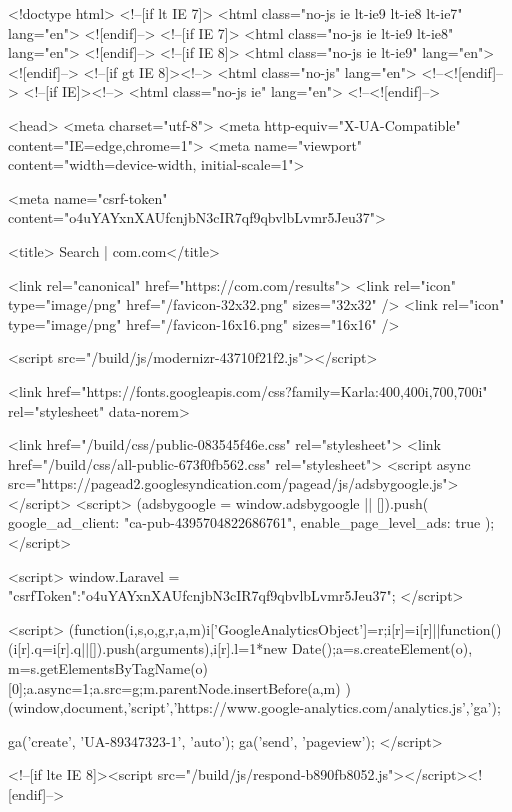 <!doctype html>
<!--[if lt IE 7]>      <html class="no-js ie lt-ie9 lt-ie8 lt-ie7" lang="en"> <![endif]-->
<!--[if IE 7]>         <html class="no-js ie lt-ie9 lt-ie8" lang="en"> <![endif]-->
<!--[if IE 8]>         <html class="no-js ie lt-ie9" lang="en"> <![endif]-->
<!--[if gt IE 8]><!--> <html class="no-js" lang="en"> <!--<![endif]-->
<!--[if IE]><!--> <html class="no-js ie" lang="en"> <!--<![endif]-->

<head>
    <meta charset="utf-8">
    <meta http-equiv="X-UA-Compatible" content="IE=edge,chrome=1">
    <meta name="viewport" content="width=device-width, initial-scale=1">

    
    <meta name="csrf-token" content="o4uYAYxnXAUfcnjbN3cIR7qf9qbvlbLvmr5Jeu37">

    <title>    Search
 | com.com</title>
    
    <link rel="canonical" href="https://com.com/results">
    <link rel="icon" type="image/png" href="/favicon-32x32.png" sizes="32x32" />
    <link rel="icon" type="image/png" href="/favicon-16x16.png" sizes="16x16" />

    
    <script src="/build/js/modernizr-43710f21f2.js"></script>

    <link href="https://fonts.googleapis.com/css?family=Karla:400,400i,700,700i" rel="stylesheet" data-norem>

        <link href="/build/css/public-083545f46e.css" rel="stylesheet">
    <link href="/build/css/all-public-673f0fb562.css" rel="stylesheet">
    <script async src="https://pagead2.googlesyndication.com/pagead/js/adsbygoogle.js"></script>
    <script>
        (adsbygoogle = window.adsbygoogle || []).push({
            google_ad_client: "ca-pub-4395704822686761",
            enable_page_level_ads: true
        });
    </script>
    
    <script>
      window.Laravel = {"csrfToken":"o4uYAYxnXAUfcnjbN3cIR7qf9qbvlbLvmr5Jeu37"};
    </script>

    <script>
        (function(i,s,o,g,r,a,m){i['GoogleAnalyticsObject']=r;i[r]=i[r]||function(){
        (i[r].q=i[r].q||[]).push(arguments)},i[r].l=1*new Date();a=s.createElement(o),
        m=s.getElementsByTagName(o)[0];a.async=1;a.src=g;m.parentNode.insertBefore(a,m)
        })(window,document,'script','https://www.google-analytics.com/analytics.js','ga');

        ga('create', 'UA-89347323-1', 'auto');
        ga('send', 'pageview');
    </script>

    
    <!--[if lte IE 8]><script src="/build/js/respond-b890fb8052.js"></script><![endif]-->

